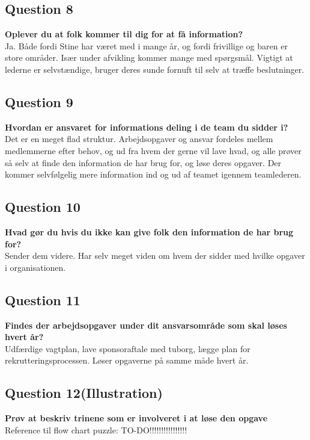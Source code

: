 \subsection{Question 8}
\label{i4q8}
\noindent \textbf{Oplever du at folk kommer til dig for at få information?} \\
Ja. Både fordi Stine har været med i mange år, og fordi frivillige og baren er store områder. Især under afvikling kommer mange med spørgsmål. Vigtigt at lederne er selvstændige, bruger deres sunde fornuft til selv at træffe beslutninger. 

\subsection{Question 9}
\label{i4q9}
\noindent \textbf{Hvordan er ansvaret for informations deling i de team du sidder i?} \\
Det er en meget flad struktur. Arbejdsopgaver og ansvar fordeles mellem medlemmerne efter behov, og ud fra hvem der gerne vil lave hvad, og alle prøver så selv at finde den information de har brug for, og løse deres opgaver. Der kommer selvfølgelig mere information ind og ud af teamet igennem  teamlederen.

\subsection{Question 10}
\label{i4q10}
\noindent \textbf{Hvad gør du hvis du ikke kan give folk den information de har brug for?} \\
Sender dem videre. Har selv meget viden om hvem der sidder med hvilke opgaver i organisationen.

\subsection{Question 11}
\label{i4q11}
\noindent \textbf{Findes der arbejdsopgaver under dit ansvarsområde som skal løses hvert år?} \\
Udfærdige vagtplan, lave sponsoraftale med tuborg, lægge plan for rekrutteringsprocessen. Løser opgaverne på samme måde hvert år.

\subsection{Question 12(Illustration)}
\label{i4q12}
\noindent \textbf{Prøv at beskriv trinene som er involveret i at løse den opgave} \\
Reference til flow chart puzzle: TO-DO!!!!!!!!!!!!!!!!